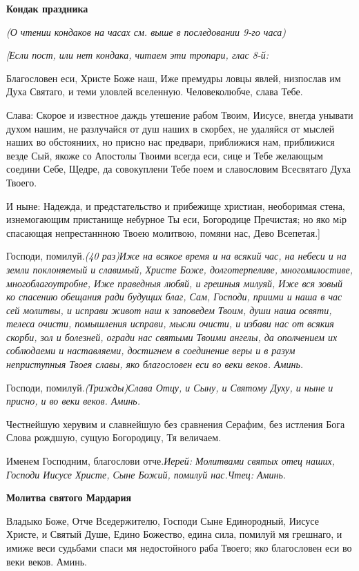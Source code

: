 \medskip
\bfseries Кондак праздника\normalfont{}\nopagebreak

\itshape (О чтении кондаков на часах см. выше в последовании 9-го час\normalfont{}а)

\itshape [Если пост, или нет кондака, читаем эти тропари, глас 8-\normalfont{}й:

Благословен еси, Христе Боже наш, Иже премудры ловцы явлей, низпослав им Духа Святаго, и теми уловлей вселенную. Человеколюбче, слава Тебе.

Слава: Скорое и известное даждь утешение рабом Твоим, Иисусе, внегда унывати духом нашим, не разлучайся от душ наших в скорбех, не удаляйся от мыслей наших во обстояниих, но присно нас предвари, приближися нам, приближися везде Сый, якоже со Апостолы Твоими всегда еси, сице и Тебе желающым соедини Себе, Щедре, да совокуплени Тебе поем и славословим Всесвятаго Духа Твоего.

И ныне: Надежда, и предстательство и прибежище христиан, необоримая стена, изнемогающим пристанище небурное Ты еси, Богородице Пречистая; но яко мiр спасающая непрестаннною Твоею молитвою, помяни нас, Дево Всепетая.]

Господи, помилуй.\itshape  (40 раз)\normalfont{}Иже на всякое время и на всякий час, на небеси и на земли поклоняемый и славимый, Христе Боже, долготерпеливе, многомилостиве, многоблагоутробне, Иже праведныя любяй, и грешныя милуяй, Иже вся зовый ко спасению обещания ради будущих благ, Сам, Господи, приими и наша в час сей молитвы, и исправи живот наш к заповедем Твоим, души наша освяти, телеса очисти, помышления исправи, мысли очисти, и избави нас от всякия скорби, зол и болезней, огради нас святыми Твоими ангелы, да ополчением их соблюдаеми и наставляеми, достигнем в соединение веры и в разум неприступныя Твоея славы, яко благословен еси во веки веков. Аминь.

Господи, помилуй.\itshape  (Трижды)\normalfont{}Слава Отцу, и Сыну, и Святому Духу, и ныне и присно, и во веки веков. Аминь.

Честнейшую херувим и славнейшую без сравнения Серафим, без истления Бога Слова рождшую, сущую Богородицу, Тя величаем.

Именем Господним, благослови отче.\itshape Иерей\normalfont{}: Молитвами святых отец наших, Господи Иисусе Христе, Сыне Божий, помилуй нас.\itshape Чтец\normalfont{}: Аминь.


\medskip
\bfseries Молитва святого Мардария\normalfont{}\nopagebreak

Владыко Боже, Отче Вседержителю, Господи Сыне Единородный, Иисусе Христе, и Святый Душе, Едино Божество, едина сила, помилуй мя грешнаго, и имиже веси судьбами спаси мя недостойного раба Твоего; яко благословен еси во веки веков. Аминь.\nopagebreak\bigskip\bigskip\mychapterending
